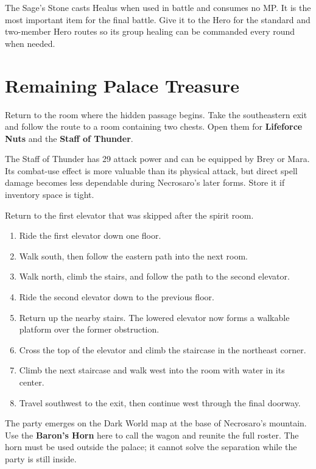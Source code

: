 \documentclass[
  american,
  10pt,
  letterpaper,
  oneside,
  open=any]{scrreprt}
\providecommand{\tightlist}{%
  \setlength{\itemsep}{0pt}\setlength{\parskip}{0pt}}
\begin{document}
The Sage's Stone casts Healus when used in battle and consumes no MP. It
is the most important item for the final battle. Give it to the Hero for
the standard and two-member Hero routes so its group healing can be
commanded every round when needed.

\section{Remaining Palace Treasure}\label{remaining-palace-treasure}

Return to the room where the hidden passage begins. Take the
southeastern exit and follow the route to a room containing two chests.
Open them for \textbf{Lifeforce Nuts} and the \textbf{Staff of Thunder}.

The Staff of Thunder has 29 attack power and can be equipped by Brey or
Mara. Its combat-use effect is more valuable than its physical attack,
but direct spell damage becomes less dependable during Necrosaro's later
forms. Store it if inventory space is tight.

Return to the first elevator that was skipped after the spirit room.

\begin{enumerate}
\def\labelenumi{\arabic{enumi}.}
\tightlist
\item
  Ride the first elevator down one floor.
\item
  Walk south, then follow the eastern path into the next room.
\item
  Walk north, climb the stairs, and follow the path to the second
  elevator.
\item
  Ride the second elevator down to the previous floor.
\item
  Return up the nearby stairs. The lowered elevator now forms a walkable
  platform over the former obstruction.
\item
  Cross the top of the elevator and climb the staircase in the northeast
  corner.
\item
  Climb the next staircase and walk west into the room with water in its
  center.
\item
  Travel southwest to the exit, then continue west through the final
  doorway.
\end{enumerate}

The party emerges on the Dark World map at the base of Necrosaro's
mountain. Use the \textbf{Baron's Horn} here to call the wagon and
reunite the full roster. The horn must be used outside the palace; it
cannot solve the separation while the party is still inside.
\end{document}
